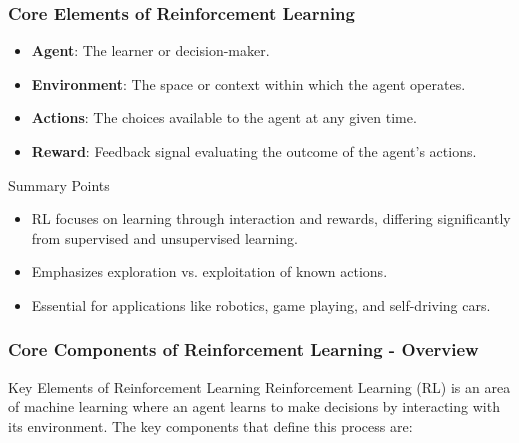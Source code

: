 \documentclass[aspectratio=169]{beamer}
\begin{document}
\begin{frame}[fragile]
    \frametitle{Core Elements of Reinforcement Learning}
    \begin{itemize}
        \item \textbf{Agent}: The learner or decision-maker.
        \item \textbf{Environment}: The space or context within which the agent operates.
        \item \textbf{Actions}: The choices available to the agent at any given time.
        \item \textbf{Reward}: Feedback signal evaluating the outcome of the agent's actions.
    \end{itemize}

    \begin{block}{Summary Points}
        \begin{itemize}
            \item RL focuses on learning through interaction and rewards, differing significantly from supervised and unsupervised learning.
            \item Emphasizes exploration vs. exploitation of known actions.
            \item Essential for applications like robotics, game playing, and self-driving cars.
        \end{itemize}
    \end{block}
\end{frame}

\begin{frame}[fragile]
  \frametitle{Core Components of Reinforcement Learning - Overview}
  \begin{block}{Key Elements of Reinforcement Learning}
    Reinforcement Learning (RL) is an area of machine learning where an agent learns to make decisions by interacting with its environment. The key components that define this process are:
  \end{block}
\end{frame}
\end{document}
